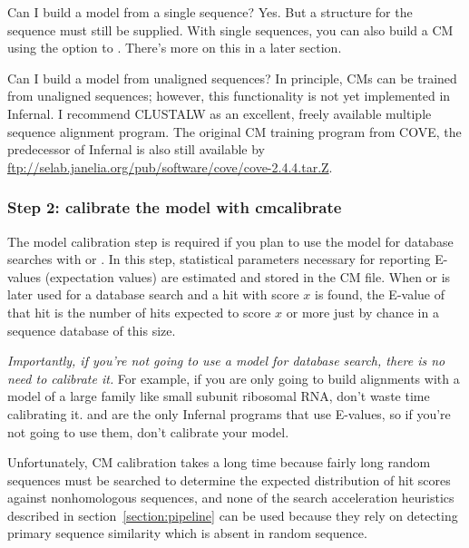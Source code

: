 \begin{srefaq}{Can I build a model from a single sequence?}
Yes. But a structure for the sequence must still be supplied.
With single sequences, you can also build a  \cite{KleinEddy03} CM 
using the  option to . There's more on
this in a later section.
\end{srefaq}

\begin{srefaq}{Can I build a model from unaligned sequences?}
In principle, CMs can be trained from unaligned sequences;
however, this functionality is not yet implemented in Infernal.  I
recommend CLUSTALW as an excellent, freely available multiple sequence
alignment program. The original  CM training
program from COVE, the predecessor of Infernal is also
still available by
\url{ftp://selab.janelia.org/pub/software/cove/cove-2.4.4.tar.Z}.
\end{srefaq}

\subsubsection{Step 2: calibrate the model with cmcalibrate}

The model calibration step is required if you plan to use the model
for database searches with  or . In this
step, statistical parameters necessary for reporting E-values
(expectation values) are estimated and stored in the CM file.  When
 or  is later used for a database search
and a hit with score $x$ is found, the E-value of that hit is the
number of hits expected to score $x$ or more just by chance in a
sequence database of this size. 

\emph{Importantly, if you're not going to use a model for database
search, there is no need to calibrate it.} For example, if you are
only going to build alignments with a model of a large family like
small subunit ribosomal RNA, don't waste time calibrating
it.  and  are the only Infernal programs
that use E-values, so if you're not going to use them, don't
calibrate your model.

Unfortunately, CM calibration takes a long time because fairly long
random sequences must be searched to determine the expected
distribution of hit scores against nonhomologous sequences, and none
of the search acceleration heuristics described in
section~\ref{section:pipeline} can be used because they rely on
detecting primary sequence similarity which is absent in random
sequence. 

